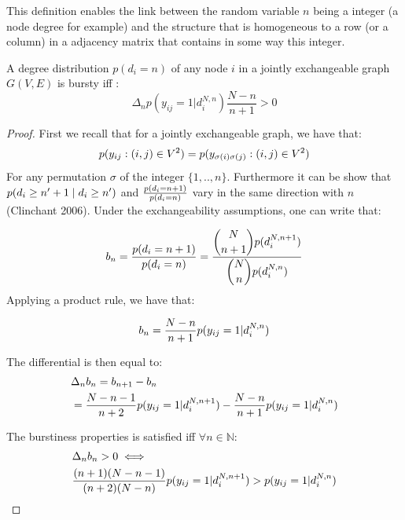This definition enables the link between the random variable $n$ being a integer (a node degree for example) and the structure that is homogeneous to a row (or a column) in a adjacency matrix that contains in some way this integer.

\begin{theorem} \label{th:burst_exch}
	 A degree distribution $p(d_i=n)$ of any node $i$ in a jointly exchangeable graph $G(V,E)$ is bursty iff :
	\begin{equation}
	 \Delta_n  p(y_{ij}=1 | d_i^{N,n}) \frac{N-n}{n+1} > 0
	\end{equation}

\end{theorem}

\begin{proof}
	First we recall that for a jointly exchangeable graph, we have that:
	\begin{equation*}
	p(y_{ij}: (i,j) \in V^2) = p(y_{\sigma(i)\sigma(j)}: (i,j) \in V^2)
	\end{equation*}
	For any permutation $\sigma$ of the integer $\{1,..,n\}$. Furthermore it can be show that $ p(d_i \geq n'+1 \mid d_i \geq n')$ and $\frac{p(d_i=n+1)}{p(d_i=n)}$ vary in the same direction with $n$ (Clinchant 2006). Under the exchangeability assumptions, one can write that:
	
	\begin{align*}
	 b_n=\frac{p(d_i=n+1)}{p(d_i=n)} = \frac{\dbinom{N}{n+1} p(d_i^{N,n+1})}{\dbinom{N}{n} p(d_i^{N,n})}
	\end{align*}
 Applying a product rule, we have that:
	
	\begin{equation*}
	b_n = \frac{N-n}{n+1} p(y_{ij}=1 | d_i^{N,n})
	\end{equation*}
	
	The differential is then equal to:
	\begin{align*}
	&\Delta_n b_n= b_{n+1} - b_n  \\
	&= \frac{N-n-1}{n+2} p(y_{ij}=1 | d_i^{N,n+1}) - \frac{N-n}{n+1} p(y_{ij}=1 | d_i^{N,n})
	\end{align*}
	
	The burstiness properties is satisfied iff $\forall n \in \mathbb{N}$:
	\begin{align*}
	&\Delta_nb_n > 0 \iff \\
	& \frac{(n+1)(N-n-1)}{(n+2)(N-n)}p(y_{ij}=1 | d_i^{N,n+1})  > p(y_{ij}=1 | d_i^{N,n})
	\end{align*}
	

\end{proof}
